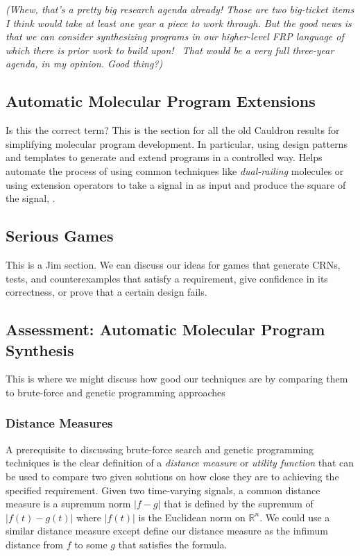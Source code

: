 \emph{%
  (Whew, that's a pretty big research agenda already!  Those are two big-ticket items I think would take at least one year a piece to work through.
  But the good news is that we can consider synthesizing programs in our higher-level FRP language of which there is prior work to build upon!~\cite{finkbeiner2019}
  That would be a \emph{very} full three-year agenda, in my opinion.  Good thing?)
}

\subsection{Automatic Molecular Program Extensions}
Is this the correct term?
This is the section for all the old Cauldron results for simplifying molecular program development.
In particular, using design patterns and templates to generate and extend programs in a controlled way.
Helps automate the process of using common techniques like \emph{dual-railing} molecules or using extension operators to take a signal in as input and produce the square of the signal, \etc.

\subsection{Serious Games}
This is a Jim section.
We can discuss our ideas for games that generate CRNs, tests, and counterexamples that satisfy a requirement, give confidence in its correctness, or prove that a certain design fails.

\subsection{Assessment: Automatic Molecular Program Synthesis}
This is where we might discuss how good our techniques are by comparing them to brute-force and genetic programming approaches

\subsubsection{Distance Measures}
A prerequisite to discussing brute-force search and genetic programming techniques is the clear definition of a \emph{distance measure} or \emph{utility function} that can be used to compare two given solutions on how close they are to achieving the specified requirement.
Given two time-varying signals, a common distance measure is a supremum norm \( |f-g| \) that is defined by the supremum of \( |f(t) - g(t)| \) where \( |f(t)| \) is the Euclidean norm on \( \mathbb{R}^n \).
We could use a similar distance measure except define our distance measure as the infimum distance from \( f \) to some \( g \) that satisfies the formula.

